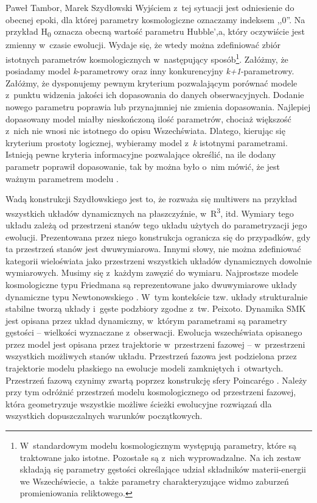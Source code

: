 \begin{artplenv2auth}{Paweł Tambor, Marek Szydłowski}
Wyjściem z~tej sytuacji jest odniesienie do obecnej epoki, dla której parametry kosmologiczne oznaczamy indeksem ,,0''. Na przykład H\textsubscript{0} oznacza obecną wartość parametru Hubble',a, który oczywiście jest zmienny w~czasie ewolucji. Wydaje się, że wtedy można zdefiniować zbiór istotnych parametrów kosmologicznych w~następujący sposób\footnote{W~standardowym modelu kosmologicznym występują parametry, które są traktowane jako istotne. Pozostałe są z~nich wyprowadzalne. Na ich zestaw składają się parametry gęstości określające udział składników materii-energii we Wszechświecie, a~także parametry charakteryzujące widmo zaburzeń promieniowania reliktowego.}. Załóżmy, że posiadamy model \textit{k}-parametrowy oraz inny konkurencyjny \textit{k+1}-parametrowy. Załóżmy, że dysponujemy pewnym kryterium pozwalającym porównać modele z~punktu widzenia jakości ich dopasowania do danych obserwacyjnych. Dodanie nowego parametru poprawia lub przynajmniej nie zmienia dopasowania. Najlepiej dopasowany model miałby nieskończoną ilość parametrów, chociaż większość z~nich nie wnosi nic istotnego do opisu Wszechświata. Dlatego, kierując się kryterium prostoty logicznej, wybieramy model z~\textit{k} istotnymi parametrami. Istnieją pewne kryteria informacyjne pozwalające określić, na ile dodany parametr poprawił dopasowanie, tak by można było o~nim mówić, że jest ważnym parametrem modelu
\parencite[][]{szydlowski_towards_2007}.%


Wadą konstrukcji Szydłowskiego jest to, że rozważa się multiwers na przykład wszystkich układów dynamicznych na płaszczyźnie, w~R\textsuperscript{3}, itd. Wymiary tego układu zależą od przestrzeni stanów tego układu użytych do parametryzacji jego ewolucji. Prezentowana przez niego konstrukcja ogranicza się do przypadków, gdy ta przestrzeń stanów jest dwuwymiarowa. Innymi słowy, nie można zdefiniować kategorii wieloświata jako przestrzeni wszystkich układów dynamicznych dowolnie wymiarowych. Musimy się z~każdym zawęzić do wymiaru. Najprostsze modele kosmologiczne typu Friedmana są reprezentowane jako dwuwymiarowe układy dynamiczne typu Newtonowskiego
\parencites[][]{szydlowski_towards_2007}[por.][]{szydlowski_filozoficzne_1983}. %
 W~tym kontekście tzw. układy strukturalnie stabilne tworzą układy i~gęste podzbiory zgodne z~tw. Peixoto. Dynamika SMK jest opisana przez układ dynamiczny, w~którym parametrami są parametry gęstości -- wielkości wyznaczane z~obserwacji. Ewolucja wszechświata opisanego przez model jest opisana przez trajektorie w~przestrzeni fazowej -- w~przestrzeni wszystkich możliwych stanów układu. Przestrzeń fazowa jest podzielona przez trajektorie modelu płaskiego na ewolucje modeli zamkniętych i~otwartych. Przestrzeń fazową czynimy zwartą poprzez konstrukcję sfery Poincarégo
\parencite{perko_differential_1996}.
 Należy przy tym odróżnić przestrzeń modelu kosmologicznego od przestrzeni fazowej, która geometryzuje wszystkie możliwe ścieżki ewolucyjne rozwiązań dla wszystkich dopuszczalnych warunków początkowych.


\end{artplenv2auth}
